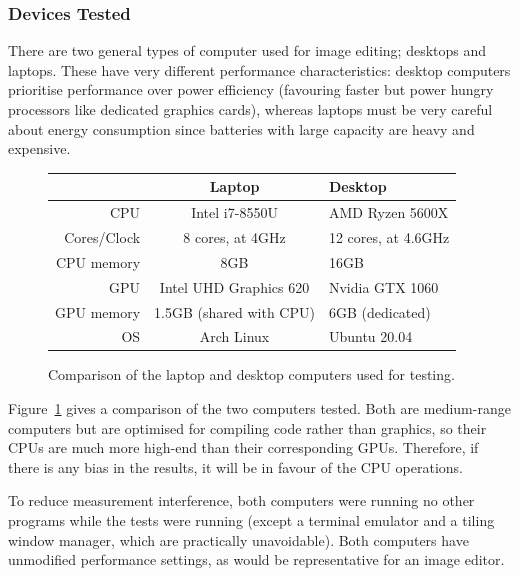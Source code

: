 \documentclass[12pt]{article}
\begin{document}
\subsubsection{Devices Tested}

There are two general types of computer used for image editing; desktops and laptops.  These have
very different performance characteristics: desktop computers prioritise performance over power
efficiency (favouring faster but power hungry processors like dedicated graphics cards), whereas
laptops must be very careful about energy consumption since batteries with large capacity are heavy
and expensive.

\begin{figure}
    \begin{center}
        \begin{tabular}{ r | c | l }
                & Laptop & Desktop \\
            \hline
            CPU & Intel i7-8550U      & AMD Ryzen 5600X \\
            Cores/Clock & 8 cores, at 4GHz & 12 cores, at 4.6GHz \\
            CPU memory & 8GB & 16GB \\
            \hline
            GPU & Intel UHD Graphics 620 & Nvidia GTX 1060 \\
            GPU memory & 1.5GB (shared with CPU) & 6GB (dedicated) \\
            \hline
            OS & Arch Linux & Ubuntu 20.04 \\
            \hline
        \end{tabular}
    \end{center}
    \caption{Comparison of the laptop and desktop computers used for
    testing.}\label{fig:test-computers}
\end{figure}

Figure~\ref{fig:test-computers} gives a comparison of the two computers tested.  Both are
medium-range computers but are optimised for compiling code rather than graphics, so their CPUs are
much more high-end than their corresponding GPUs.  Therefore, if there is any bias in the results,
it will be in favour of the CPU operations.

To reduce measurement interference, both computers were running no other programs while the tests
were running (except a terminal emulator and a tiling window manager, which are practically
unavoidable).  Both computers have unmodified performance settings, as would be representative for
an image editor.
\end{document}
